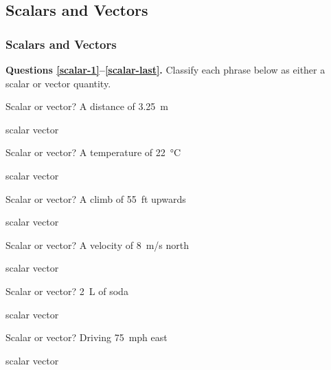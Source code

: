 \documentclass[answers]{exam}
\begin{document}
\subsection{Scalars and Vectors}

\subsubsection{Scalars and Vectors}

\textbf{Questions \ref{scalar-1}--\ref{scalar-last}.} Classify each phrase below as either a scalar or vector quantity.

\begin{questions}

\question \label{scalar-1}
Scalar or vector? A distance of \SI{3.25}{m}

\begin{randomizechoices}[norandomize]
    \correctchoice scalar
    \choice vector
\end{randomizechoices}


\question
Scalar or vector? A temperature of \SI{22}{\degreeCelsius}

\begin{randomizechoices}[norandomize]
    \correctchoice scalar
    \choice vector
\end{randomizechoices}


\question
Scalar or vector? A climb of \SI{55}{ft} upwards

\begin{randomizechoices}[norandomize]
    \choice scalar
    \correctchoice vector
\end{randomizechoices}


\question
Scalar or vector? A velocity of \SI{8}{m/s} north

\begin{randomizechoices}[norandomize]
    \choice scalar
    \correctchoice vector
\end{randomizechoices}


\question
Scalar or vector? \SI{2}{L} of soda

\begin{randomizechoices}[norandomize]
    \correctchoice scalar
    \choice vector
\end{randomizechoices}


\question
Scalar or vector? Driving \SI{75}{mph} east

\begin{randomizechoices}[norandomize]
    \choice scalar
    \correctchoice vector
\end{randomizechoices}



\end{questions}
\end{document}
